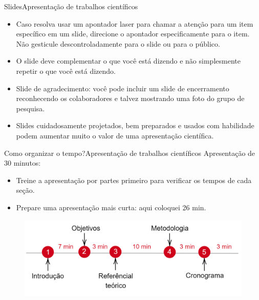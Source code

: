 \documentclass[t]{beamer}
\begin{document}

\begin{ftst}{Slides}{Apresentação de trabalhos científicos}
\begin{itemize}
    \item Caso resolva usar um apontador laser para chamar a atenção para um item específico em um slide, direcione o apontador especificamente para o item. Não gesticule descontroladamente para o slide ou para o público.
    \item O slide deve complementar o que você está dizendo e não simplesmente repetir o que você está dizendo.
    \item Slide de agradecimento: você pode incluir um slide de encerramento reconhecendo os colaboradores e talvez mostrando uma foto do grupo de pesquisa. 
    \item Slides cuidadosamente projetados, bem preparados e usados com habilidade podem aumentar muito o valor de uma apresentação científica.
\end{itemize}
\end{ftst}


\begin{ftst}{Como organizar o tempo?}{Apresentação de trabalhos científicos}
Apresentação de 30 minutos:
\begin{itemize}
    \item Treine a apresentação por partes primeiro para verificar os tempos de cada seção.
    \item Prepare uma apresentação mais curta: aqui coloquei 26 min.
\end{itemize}
\vone

\begin{figure}
    \centering
    \includegraphics[scale=0.2]{Figuras/tempo.png}
\end{figure}
\end{ftst}
\end{document}
